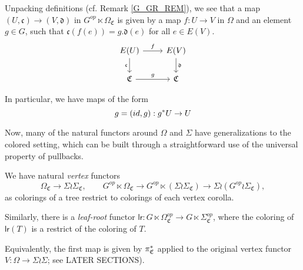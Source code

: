 \documentclass[a4paper,10pt
,draft
]{article}%
\renewcommand{\1}{\eta}%
\newcommand{\SC}{\Sigma_{\mathfrak C}}
\newcommand{\OC}{\Omega_{\mathfrak C}}
\begin{document}
Unpacking definitions (cf. Remark \ref{G_GR_REM}), we see that a map $(U, \mathfrak c) \to (V, \mathfrak d)$ in $G^{op} \ltimes \Omega_{\mathfrak C}$
is given by
a map $f: U \to V$ in $\Omega$ and an element $g\in G$,
such that $\mathfrak c(f(e)) = g.\mathfrak d(e)$ for all $e \in E(V)$.
\begin{equation}
      \begin{tikzcd}
            E(U) \arrow[d, "\mathfrak c"'] \arrow[r, "f"]
            &
            E(V) \arrow[d, "\mathfrak d"]
            \\
            \mathfrak C \arrow[r, "g"] 
            &
            \mathfrak C
      \end{tikzcd}
\end{equation}

In particular, we have maps of the form
\begin{equation}
      g = (id, g): g^{\**} U \to U
\end{equation}



Now, many of the natural functors around $\Omega$ and $\Sigma$ have generalizations to the colored setting,
which can be built through a straightforward use of the universal property of pullbacks.

\begin{definition}
      We have natural \textit{vertex} functors
      \begin{equation}
            \OC \to \Sigma \wr \SC,
            \qquad
            G^{op} \ltimes \OC \to G^{op} \ltimes (\Sigma \wr \SC) \to \Sigma \wr (G^{op} \wr \SC),
      \end{equation}
      as colorings of a tree restrict to colorings of each vertex corolla.

      Similarly, there is a \textit{leaf-root} functor
      $\mathsf{lr}: G \ltimes \Omega_{\mathfrak C}^{op} \to G \ltimes \Sigma_{\mathfrak C}^{op}$,
      where the coloring of $\mathsf{lr}(T)$ is a restrict of the coloring of $T$.
\end{definition}

\begin{remark}
      Equivalently, the first map is given by $\pi_{\mathfrak C}^{\**}$ applied to the original vertex functor
      $V: \Omega \to \Sigma \wr \Sigma$;
      see {\color{red} LATER SECTIONS}).
\end{remark}
\end{document}

